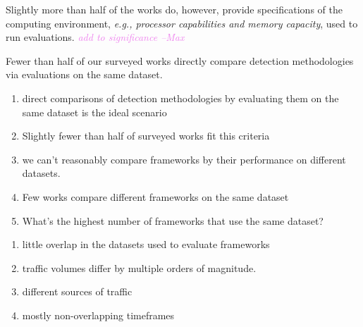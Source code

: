 \documentclass[manuscript,nonacm]{acmart}
\newcommand{\maxnote}[1]{\textit{\textcolor{violet}{#1 --Max}}}
\begin{document}
Slightly more than half of the works do, however, provide specifications of the computing environment, \textit{e.g., processor capabilities and memory capacity}, used to run evaluations.
\maxnote{add to significance}

Fewer than half of our surveyed works directly compare detection methodologies via evaluations on the same dataset.


\begin{enumerate}
    \item direct comparisons of detection methodologies by evaluating them on the same dataset is the ideal scenario
    \item Slightly fewer than half of surveyed works fit this criteria
	\item we can't reasonably compare frameworks by their performance on different datasets.
	\item Few works compare different frameworks on the same dataset
	\item What's the highest number of frameworks that use the same dataset?
\end{enumerate}

\begin{enumerate}
    \item little overlap in the datasets used to evaluate frameworks
    \item traffic volumes differ by multiple orders of magnitude.
    \item different sources of traffic
    \item mostly non-overlapping timeframes
\end{enumerate}
\end{document}
